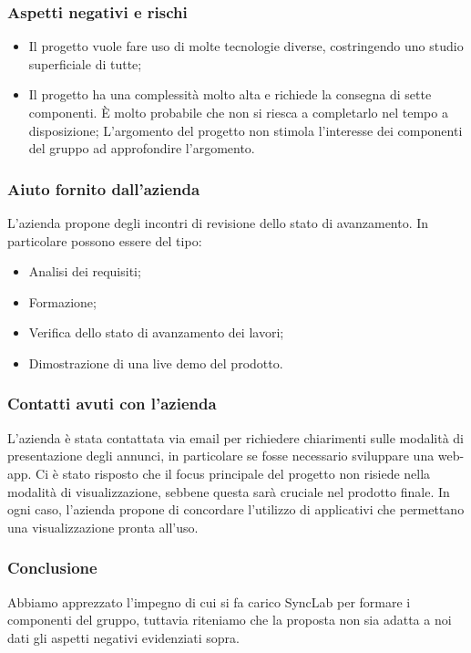 \documentclass[10pt]{article}
\begin{document}
\subsubsection{Aspetti negativi e rischi}
\begin{itemize}
    \item Il progetto vuole fare uso di molte tecnologie diverse, costringendo uno studio superficiale di tutte;
    \item Il progetto ha una complessità molto alta e richiede la consegna di sette componenti. È molto probabile che non si riesca a completarlo nel tempo a disposizione;
    L’argomento del progetto non stimola l’interesse dei componenti del gruppo ad approfondire l’argomento.
\end{itemize}
\subsubsection{Aiuto fornito dall'azienda}
L’azienda propone degli incontri di revisione dello stato di avanzamento. In particolare possono essere del tipo:
\begin{itemize}
    \item Analisi dei requisiti;
    \item Formazione;
    \item Verifica dello stato di avanzamento dei lavori;
    \item Dimostrazione di una live demo del prodotto.
\end{itemize}
\subsubsection{Contatti avuti con l'azienda}
L'azienda è stata contattata via email per richiedere chiarimenti sulle modalità di presentazione degli annunci, in particolare se fosse necessario sviluppare una web-app. Ci è stato risposto che il focus principale del progetto non risiede nella modalità di visualizzazione, sebbene questa sarà cruciale nel prodotto finale. In ogni caso, l'azienda propone di concordare l'utilizzo di applicativi che permettano una visualizzazione pronta all'uso.
\subsubsection{Conclusione}
Abbiamo apprezzato l’impegno di cui si fa carico SyncLab per formare i componenti del gruppo, tuttavia riteniamo che la proposta non sia adatta a noi dati gli aspetti negativi evidenziati sopra.
\\\\
\end{document}
